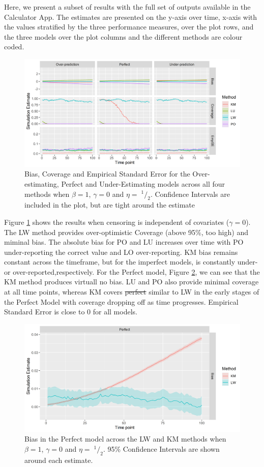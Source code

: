\documentclass[
]{article}
\newcommand{\sfrac}[2]{\;^{#1}/_{#2}}
\begin{document}
Here, we present a subset of results with the full set of outputs available in the Calculator App. The estimates are presented on the y-axis over time, x-axis with the values stratified by the three performance measures, over the plot rows, and the three models over the plot columns and the different methods are colour coded.
\begin{figure}
\centering
\includegraphics{figure/IPCW_Logistic/MainPlot_b(1)_g(0)_e(0.5).png}
\caption{\label{fig:MainPlotg0}Bias, Coverage and Empirical Standard Error for the Over-estimating, Perfect and Under-Estimating models across all four methods when \(\beta=1\), \(\gamma=0\) and \(\eta=\sfrac{1}{2}\). Confidence Intervals are included in the plot, but are tight around the estimate}
\end{figure}
Figure \ref{fig:MainPlotg0} shows the results when censoring is independent of covariates (\(\gamma=0\)). The LW method provides over-optimistic Coverage (above 95\%, too high) and miminal bias. The absolute bias for PO and LU increases over time with PO under-reporting the correct value and LO over-reporting. KM bias remains constant across the timeframe, but for the imperfect models, is constantly under- or over-reported,respectively. For the Perfect model, Figure \ref{fig:BiasPlotg0}, we can see that the KM method produces virtuall no bias. LU and PO also provide minimal coverage at all time points, whereas KM covers \sout{perfect} similar to LW in the early stages of the Perfect Model with coverage dropping off as time progresses. Empirical Standard Error is close to 0 for all models.
\begin{figure}
\centering
\includegraphics{figure/IPCW_Logistic/Bias_b(1)_g(0)_e(0.5).png}
\caption{\label{fig:BiasPlotg0}Bias in the Perfect model across the LW and KM methods when \(\beta=1\), \(\gamma=0\) and \(\eta=\sfrac{1}{2}\). 95\% Confidence Intervals are shown around each estimate.}
\end{figure}
\end{document}
